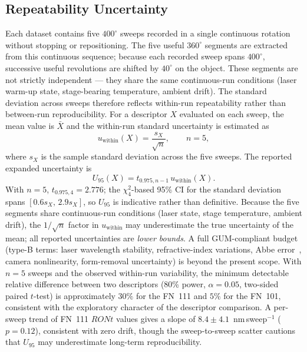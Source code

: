 \documentclass[review]{elsarticle}
\begin{document}
\subsection{Repeatability Uncertainty}
Each dataset contains five $400^\circ$ sweeps recorded in a single continuous rotation without stopping or repositioning. The five useful $360^\circ$ segments are extracted from this continuous sequence; because each recorded sweep spans $400^\circ$, successive useful revolutions are shifted by $40^\circ$ on the object. These segments are not strictly independent — they share the same continuous-run conditions (laser warm-up state, stage-bearing temperature, ambient drift). The standard deviation across sweeps therefore reflects within-run repeatability rather than between-run reproducibility. For a descriptor $X$ evaluated on each sweep, the mean value is $\bar{X}$ and the within-run standard uncertainty is estimated as
\begin{equation}
u_{\mathrm{within}}(X)=\frac{s_X}{\sqrt{n}}, \qquad n=5,
\end{equation}
where $s_X$ is the sample standard deviation across the five sweeps. The reported expanded uncertainty is
\begin{equation}
U_{95}(X)=t_{0.975,n-1}\,u_{\mathrm{within}}(X).
\end{equation}
With $n=5$, $t_{0.975,4}=2.776$; the $\chi^2_4$-based 95\% CI for the standard deviation spans $[0.6s_X,\,2.9s_X]$, so $U_{95}$ is indicative rather than definitive. Because the five segments share continuous-run conditions (laser state, stage temperature, ambient drift), the $1/\sqrt{n}$ factor in $u_{\mathrm{within}}$ may underestimate the true uncertainty of the mean; all reported uncertainties are \emph{lower bounds}. A full GUM-compliant budget (type-B terms: laser wavelength stability, refractive-index variations, Abbe error~\cite{NewportCorporation:2018vk}, camera nonlinearity, form-removal uncertainty) is beyond the present scope. With $n=5$ sweeps and the observed within-run variability, the minimum detectable relative difference between two descriptors (80\% power, $\alpha=0.05$, two-sided paired $t$-test) is approximately $30\%$ for the FN~111 and $5\%$ for the FN~101, consistent with the exploratory character of the descriptor comparison. A per-sweep trend of FN~111 $RONt$ values gives a slope of $8.4\pm4.1$~nm\,sweep$^{-1}$ ($p=0.12$), consistent with zero drift, though the sweep-to-sweep scatter cautions that $U_{95}$ may underestimate long-term reproducibility.
\end{document}
